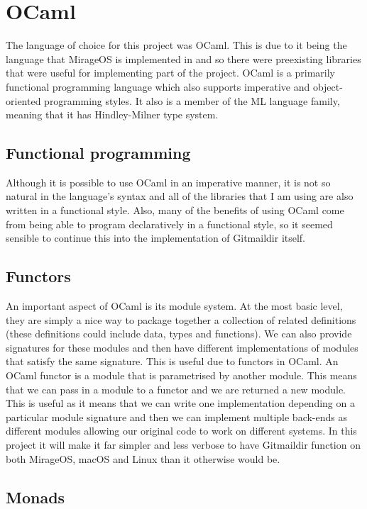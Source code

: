 \section{OCaml}

The language of choice for this project was OCaml\cite{code_ocaml}. This is due to it being the language that MirageOS is implemented in and so there were preexisting libraries that were useful for implementing part of the project. OCaml is a primarily functional programming language which also supports imperative and object-oriented programming styles. It also is a member of the ML language family, meaning that it has Hindley-Milner type system.

\subsection{Functional programming}

Although it is possible to use OCaml in an imperative manner, it is not so natural in the language's syntax and all of the libraries that I am using are also written in a functional style. Also, many of the benefits of using OCaml come from being able to program declaratively in a functional style, so it seemed sensible to continue this into the implementation of Gitmaildir itself.

\subsection{Functors}

An important aspect of OCaml is its module system. At the most basic level, they are simply a nice way to package together a collection of related definitions (these definitions could include data, types and functions). We can also provide signatures for these modules and then have different implementations of modules that satisfy the same signature. This is useful due to functors in OCaml. An OCaml functor is a module that is parametrised by another module. This means that we can pass in a module to a functor and we are returned a new module. This is useful as it means that we can write one implementation depending on a particular module signature and then we can implement multiple back-ends as different modules allowing our original code to work on different systems. In this project it will make it far simpler and less verbose to have Gitmaildir function on both MirageOS, macOS and Linux than it otherwise would be.

\subsection{Monads}

